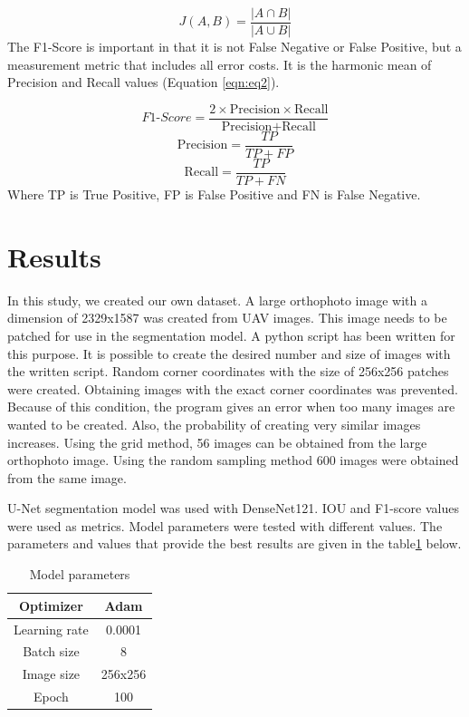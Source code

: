 \documentclass[a4paper,fleqn]{cas-sc}
\begin{document}
\begin{equation}
\label{eqn:eq1}
    J(A,B) = \frac{|A \cap B|}{|A \cup B|}
\end{equation}
The F1-Score is important in that it is not False Negative or False Positive, but a measurement metric that includes all error costs. It is the harmonic mean of Precision and Recall values (Equation \ref{eqn:eq2}).

\begin{equation}
\label{eqn:eq2}
F1\text{-}Score = \frac{2 \times \text{Precision} \times \text{Recall}}{\text{Precision} + \text{Recall}}
\end{equation}
\[
\text{Precision} = \frac{TP}{TP + FP}
\]
\[
\text{Recall} = \frac{TP}{TP + FN}
\]
Where TP is True Positive, FP is False Positive and FN is False Negative.


\section{Results}
In this study, we created our own dataset. A large orthophoto image with a dimension of 2329x1587 was created from UAV images. This image needs to be patched for use in the segmentation model. A python script has been written for this purpose. It is possible to create the desired number and size of images with the written script. Random corner coordinates with the size of 256x256 patches were created. Obtaining images with the exact corner coordinates was prevented. Because of this condition, the program gives an error when too many images are wanted to be created. Also, the probability of creating very similar images increases. Using the grid method, 56 images can be obtained from the large orthophoto image. Using the random sampling method 600 images were obtained from the same image.

U-Net segmentation model was used with DenseNet121. IOU and F1-score values were used as metrics. Model parameters were tested with different values. The parameters and values that provide the best results are given in the table\ref{tab:Table1} below.


\begin{table}
	\centering
	\caption{Model parameters}
	\label{tab:Table1}
	\begin{tabular}{ |c|c|} 
		\hline
		Optimizer&Adam\\ 
		\hline 
		Learning rate&0.0001\\
		\hline
		Batch size&8\\
		\hline
		Image size&256x256\\
		\hline
		Epoch&100\\
		\hline
	\end{tabular} 
\end{table}
\end{document}
